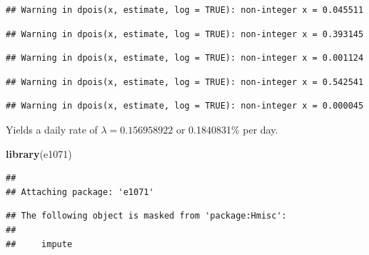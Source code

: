 \documentclass[]{article}
\newenvironment{Shaded}{\begin{snugshade}}{\end{snugshade}}
\newcommand{\KeywordTok}[1]{\textcolor[rgb]{0.13,0.29,0.53}{\textbf{#1}}}
\newcommand{\NormalTok}[1]{#1}
\newcommand{\OperatorTok}[1]{\textcolor[rgb]{0.81,0.36,0.00}{\textbf{#1}}}
\newcommand{\StringTok}[1]{\textcolor[rgb]{0.31,0.60,0.02}{#1}}
\begin{document}
\begin{verbatim}
## Warning in dpois(x, estimate, log = TRUE): non-integer x = 0.045511
\end{verbatim}

\begin{verbatim}
## Warning in dpois(x, estimate, log = TRUE): non-integer x = 0.393145
\end{verbatim}

\begin{verbatim}
## Warning in dpois(x, estimate, log = TRUE): non-integer x = 0.001124
\end{verbatim}

\begin{verbatim}
## Warning in dpois(x, estimate, log = TRUE): non-integer x = 0.542541
\end{verbatim}

\begin{verbatim}
## Warning in dpois(x, estimate, log = TRUE): non-integer x = 0.000045
\end{verbatim}

Yields a daily rate of \(\lambda = 0.156958922\) or 0.1840831\% per
day.\medskip

\begin{Shaded}
\begin{Highlighting}[]
\KeywordTok{library}\NormalTok{(e1071)}
\end{Highlighting}
\end{Shaded}

\begin{verbatim}
## 
## Attaching package: 'e1071'
\end{verbatim}

\begin{verbatim}
## The following object is masked from 'package:Hmisc':
## 
##     impute
\end{verbatim}

\begin{Shaded}
\end{Shaded}
\end{document}
